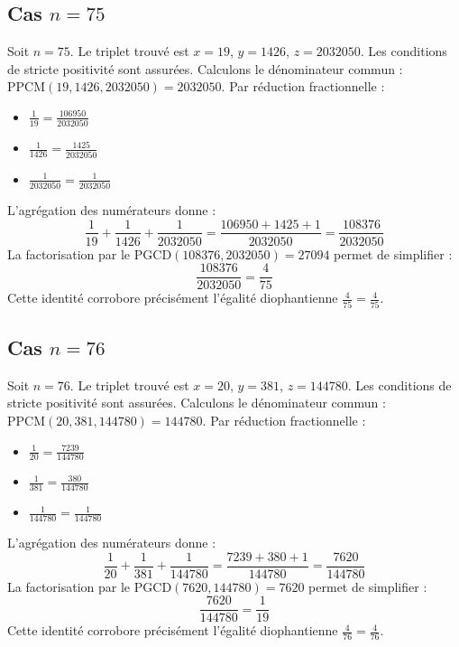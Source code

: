 \documentclass[11pt,a4paper]{article}
\begin{document}
\subsection{Cas $n = 75$}
Soit $n = 75$. Le triplet trouvé est $x = 19$, $y = 1426$, $z = 2032050$.
Les conditions de stricte positivité sont assurées.
Calculons le dénominateur commun : $\text{PPCM}(19, 1426, 2032050) = 2032050$.
Par réduction fractionnelle :
\begin{itemize}
    \item $\frac{1}{19} = \frac{106950}{2032050}$
    \item $\frac{1}{1426} = \frac{1425}{2032050}$
    \item $\frac{1}{2032050} = \frac{1}{2032050}$
\end{itemize}
L'agrégation des numérateurs donne :
$$ \frac{1}{19} + \frac{1}{1426} + \frac{1}{2032050} = \frac{106950 + 1425 + 1}{2032050} = \frac{108376}{2032050} $$
La factorisation par le $\text{PGCD}(108376, 2032050) = 27094$ permet de simplifier :
$$ \frac{108376}{2032050} = \frac{4}{75} $$
Cette identité corrobore précisément l'égalité diophantienne $\frac{4}{75} = \frac{4}{75}$.

\subsection{Cas $n = 76$}
Soit $n = 76$. Le triplet trouvé est $x = 20$, $y = 381$, $z = 144780$.
Les conditions de stricte positivité sont assurées.
Calculons le dénominateur commun : $\text{PPCM}(20, 381, 144780) = 144780$.
Par réduction fractionnelle :
\begin{itemize}
    \item $\frac{1}{20} = \frac{7239}{144780}$
    \item $\frac{1}{381} = \frac{380}{144780}$
    \item $\frac{1}{144780} = \frac{1}{144780}$
\end{itemize}
L'agrégation des numérateurs donne :
$$ \frac{1}{20} + \frac{1}{381} + \frac{1}{144780} = \frac{7239 + 380 + 1}{144780} = \frac{7620}{144780} $$
La factorisation par le $\text{PGCD}(7620, 144780) = 7620$ permet de simplifier :
$$ \frac{7620}{144780} = \frac{1}{19} $$
Cette identité corrobore précisément l'égalité diophantienne $\frac{4}{76} = \frac{4}{76}$.
\end{document}

